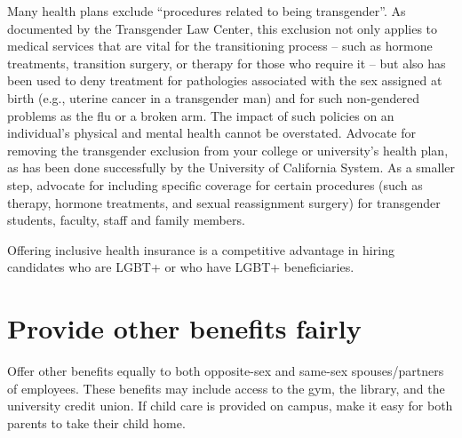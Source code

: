 Many health plans exclude ``procedures related to being transgender''. As documented by the Transgender Law Center, this exclusion not only applies to medical services that are vital for the transitioning process -- such as hormone treatments, transition surgery, or therapy for those who require it -- but also has been used to deny treatment for pathologies associated with the sex assigned at birth (e.g., uterine cancer in a transgender man) and for such non-gendered problems as the flu or a broken arm. The impact of such policies on an individual's physical and mental health cannot be overstated. Advocate for removing the transgender exclusion from your college or university's health plan, as has been done successfully by the University of California System.  As a smaller step, advocate for including specific coverage for certain procedures (such as therapy, hormone treatments, and sexual reassignment surgery) for transgender students, faculty, staff and family members.

Offering inclusive health insurance is a competitive advantage in hiring candidates who are LGBT+ or who have LGBT+ beneficiaries.



\section {Provide other benefits fairly}
\label{other-benefits}
Offer other benefits equally to both opposite-sex and same-sex spouses/partners of employees.  These benefits may include access to the gym, the library, and the university credit union.  If child care is provided on campus, make it easy for both parents to take their child home.  


